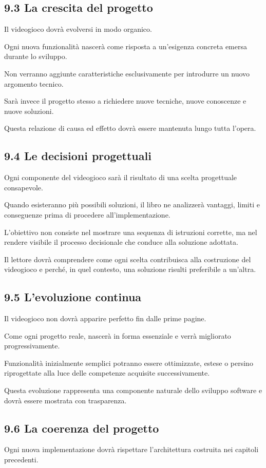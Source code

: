 \documentclass{article}
\begin{document}
\subsection{9.3 La crescita del progetto}
Il videogioco dovrà evolversi in modo organico.

Ogni nuova funzionalità nascerà come risposta a un'esigenza concreta emersa durante lo sviluppo.

Non verranno aggiunte caratteristiche esclusivamente per introdurre un nuovo argomento tecnico.

Sarà invece il progetto stesso a richiedere nuove tecniche, nuove conoscenze e nuove soluzioni.

Questa relazione di causa ed effetto dovrà essere mantenuta lungo tutta l'opera.

\subsection{9.4 Le decisioni progettuali}
Ogni componente del videogioco sarà il risultato di una scelta progettuale consapevole.

Quando esisteranno più possibili soluzioni, il libro ne analizzerà vantaggi, limiti e conseguenze prima di procedere
all'implementazione.

L'obiettivo non consiste nel mostrare una sequenza di istruzioni corrette, ma nel rendere visibile il processo
decisionale che conduce alla soluzione adottata.

Il lettore dovrà comprendere come ogni scelta contribuisca alla costruzione del videogioco e perché, in quel contesto,
una soluzione risulti preferibile a un'altra.

\subsection[9.5 L{}'evoluzione continua]{9.5 L'evoluzione continua}
Il videogioco non dovrà apparire perfetto fin dalle prime pagine.

Come ogni progetto reale, nascerà in forma essenziale e verrà migliorato progressivamente.

Funzionalità inizialmente semplici potranno essere ottimizzate, estese o persino riprogettate alla luce delle competenze
acquisite successivamente.

Questa evoluzione rappresenta una componente naturale dello sviluppo software e dovrà essere mostrata con trasparenza.

\subsection{9.6 La coerenza del progetto}
Ogni nuova implementazione dovrà rispettare l'architettura costruita nei capitoli precedenti.
\end{document}
